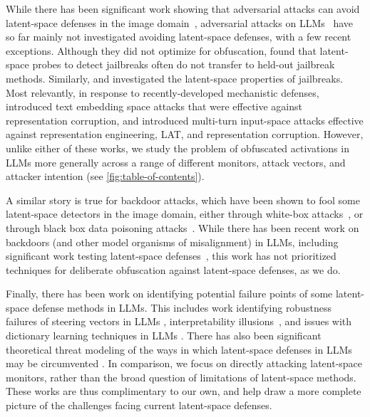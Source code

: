 \documentclass{article}
\begin{document}
 While there has been significant work showing that adversarial attacks can avoid latent-space defenses in the image domain~\citep{carlini2017adversarial, athalye2018obfuscated, hosseini2019are, kaya2022generating}, adversarial attacks on LLMs~\citep{yang2021careful, wei2023jailbroken, carlini2024aligned, zou2023universal} have so far mainly not investigated avoiding latent-space defenses, with a few recent exceptions. Although they did not optimize for obfuscation, \citet{kirch2024features} found that latent-space probes to detect jailbreaks often do not transfer to held-out jailbreak methods. Similarly, \citet{arditi2024refusal} and \citet{jain2024what} investigated the latent-space properties of jailbreaks. Most relevantly, in response to recently-developed mechanistic defenses, \citet{schwinn2024revisiting} introduced text embedding space attacks that were effective against representation corruption, and \citet{li2024llm} introduced multi-turn input-space attacks effective against representation engineering, LAT, and representation corruption. However, unlike either of these works, we study the problem of obfuscated activations in LLMs more generally across a range of different monitors, attack vectors,
 and attacker intention (see \cref{fig:table-of-contents}).  

A similar story is true for backdoor attacks, which have been shown to fool some latent-space detectors in the image domain, either through white-box attacks~\citep{tan2020bypassing, jia2021badencoder, doan2021backdoor, goldwasser2022planting, belrose2023eliciting, tao2024distribution, liang2024badclip}, or through black box data poisoning attacks~\citep{tang2021demon}. While there has been recent work on backdoors (and other model organisms of misalignment) in LLMs, including significant work testing latent-space defenses~\citep{sheng2022survey, mallen2023eliciting, macdiarmid2024sleeperagentprobes, clymer2024poser}, this work has not prioritized techniques for deliberate obfuscation against latent-space defenses,
as we do. 

Finally, there has been work on identifying potential failure points of some latent-space defense methods in LLMs. This includes work identifying robustness failures of steering vectors in LLMs \citep{tan2024analyzing, brumley2024comparing, braun2024sober}, interpretability illusions~\citep{friedman2023interpretability, makelov2023illusion}, and issues with dictionary learning techniques in LLMs \citep{chanin2024a}. There has also been significant theoretical threat modeling of the ways in which latent-space defenses in LLMs may be circumvented \citep{hubinger2019gradient, sharkey2022circumventing}.
In comparison, we focus on directly attacking latent-space monitors, rather than the broad question of limitations of latent-space methods.
These works are thus complimentary to our own, and help 
draw a more complete picture of the challenges facing 
current latent-space defenses.
\end{document}
